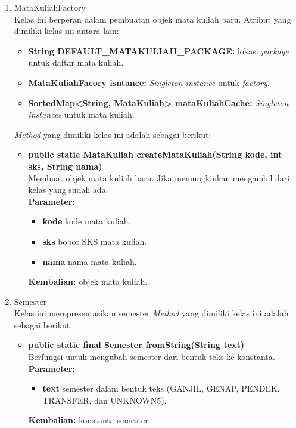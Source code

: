 \begin{enumerate}
\begin{enumerate}
		\item MataKuliahFactory\\
		Kelas ini berperan dalam pembuatan objek mata kuliah baru. Atribut yang dimiliki kelas ini antara lain:
		\begin{itemize}
			\item \textbf{String DEFAULT\_MATAKULIAH\_PACKAGE:} lokasi \textit{package} untuk daftar mata kuliah.
			\item \textbf{MataKuliahFacory isntance:} \textit{Singleton instance} untuk \textit{factory}.
			\item \textbf{SortedMap<String, MataKuliah> mataKuliahCache:} \textit{Singleton instances} untuk mata kuliah.
		\end{itemize}
		\textit{Method} yang dimiliki kelas ini adalah sebagai berikut:
		\begin{itemize}	
			\item \textbf{public static MataKuliah createMataKuliah(String kode, int sks, String nama)} \\
			Membuat objek mata kuliah baru. Jika memungkinkan mengambil dari kelas yang sudah ada.\\
			\textbf{Parameter:}
			\begin{itemize}
				\item \textbf{kode} kode mata kuliah.
				\item \textbf{sks} bobot SKS mata kuliah.
				\item \textbf{nama} nama mata kuliah.
			\end{itemize}
			\textbf{Kembalian:} objek mata kuliah.
		\end{itemize}
		
		\item Semester\\
		Kelas ini merepresentasikan semester
		\textit{Method} yang dimiliki kelas ini adalah sebagai berikut:
		\begin{itemize}
			\item \textbf{public static final Semester fromString(String text)} \\
			Berfungsi untuk mengubah semester dari bentuk teks ke konstanta. \\
			\textbf{Parameter:}
			\begin{itemize}
				\item \textbf{text} semester dalam bentuk teks (GANJIL, GENAP, PENDEK, TRANSFER, dan UNKNOWN5).
			\end{itemize}
			\textbf{Kembalian:} konstanta semester.
		\end{itemize}
		

\end{enumerate}
\end{enumerate}
